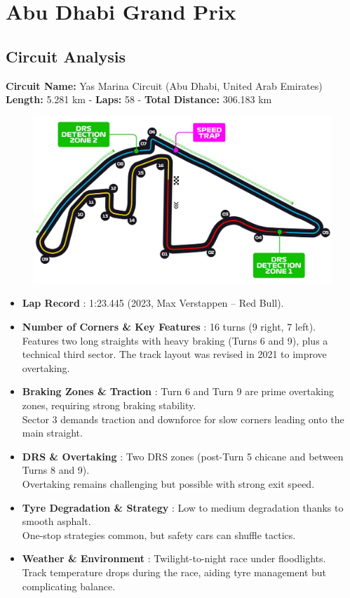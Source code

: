 \section{Abu Dhabi Grand Prix}

\subsection{Circuit Analysis}

\textbf{Circuit Name:} Yas Marina Circuit (Abu Dhabi, United Arab Emirates) \\
\textbf{Length:} 5.281 km - \textbf{Laps:} 58 - \textbf{Total Distance:} 306.183 km

\begin{figure}[H]
    \centering
    \includegraphics[width=0.75\linewidth]{images/24.Abu_Dhabi_Circuit.jpg}
\end{figure}

\begin{itemize}
    \item \textbf{Lap Record} : 1:23.445 (2023, Max Verstappen – Red Bull). 

    \item \textbf{Number of Corners \& Key Features} : 16 turns (9 right, 7 left). \\
    Features two long straights with heavy braking (Turns 6 and 9), plus a technical third sector. 
    The track layout was revised in 2021 to improve overtaking.

    \item \textbf{Braking Zones \& Traction} : Turn 6 and Turn 9 are prime overtaking zones, requiring strong braking stability. \\
    Sector 3 demands traction and downforce for slow corners leading onto the main straight.

    \item \textbf{DRS \& Overtaking} : Two DRS zones (post-Turn 5 chicane and between Turns 8 and 9). \\
    Overtaking remains challenging but possible with strong exit speed.

    \item \textbf{Tyre Degradation \& Strategy} : Low to medium degradation thanks to smooth asphalt. \\
    One-stop strategies common, but safety cars can shuffle tactics.

    \item \textbf{Weather \& Environment} : Twilight-to-night race under floodlights. \\
    Track temperature drops during the race, aiding tyre management but complicating balance.
\end{itemize}

